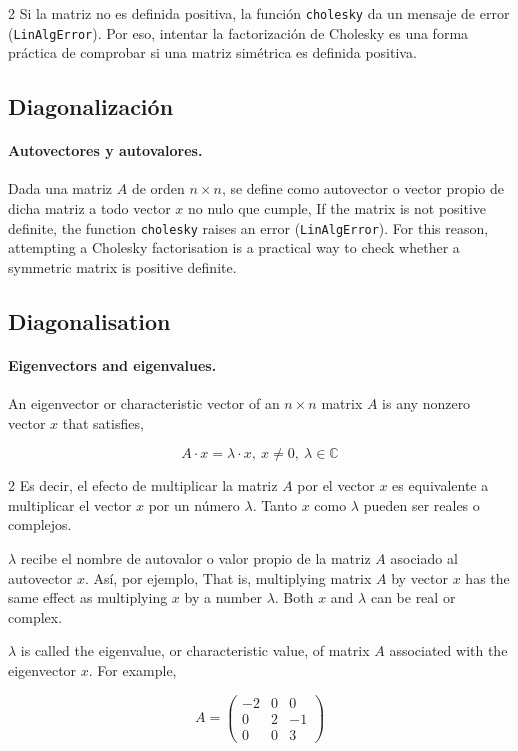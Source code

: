 \begin{paracol}{2}
Si la matriz no es definida positiva, la función \texttt{cholesky} da un mensaje de error (\texttt{LinAlgError}). Por eso, intentar la factorización de Cholesky es una forma práctica de comprobar si una matriz simétrica es definida positiva.

\subsection{Diagonalización}\label{sec:diag}
\paragraph{Autovectores y autovalores.} Dada una matriz $A$ de orden $n\times n$, se define como autovector o vector propio de dicha matriz a todo vector $x$ no nulo que cumple,
\switchcolumn
If the matrix is not positive definite, the function \texttt{cholesky} raises an error (\texttt{LinAlgError}). For this reason, attempting a Cholesky factorisation is a practical way to check whether a symmetric matrix is positive definite.
\subsection{Diagonalisation}
\paragraph{Eigenvectors and eigenvalues.} An eigenvector or characteristic vector of an $n\times n$ matrix $A$ is any nonzero vector $x$ that satisfies, 
\end{paracol}
\begin{equation*}
A\cdot x =\lambda \cdot x, \  x\neq 0, \ \lambda \in \mathbb{C}
\end{equation*}
\begin{paracol}{2}
Es decir, el efecto de multiplicar la matriz $A$ por el vector $x$ es equivalente a multiplicar el vector $x$  por un número $\lambda$. Tanto $x$ como $\lambda$ pueden ser reales o complejos.

$\lambda$ recibe el nombre de autovalor o valor propio de la matriz $A$ asociado al autovector $x$. Así, por ejemplo,
\switchcolumn
That is, multiplying matrix $A$ by vector $x$ has the same effect as multiplying $x$ by a number $\lambda$. Both $x$ and $\lambda$ can be real or complex.

$\lambda$ is called the eigenvalue, or characteristic value, of matrix $A$ associated with the eigenvector $x$. For example,
\end{paracol}
\begin{equation*}
A= \begin{pmatrix}
-2& 0& 0\\
0& 2 & -1\\
0& 0& 3
\end{pmatrix}
\end{equation*}

